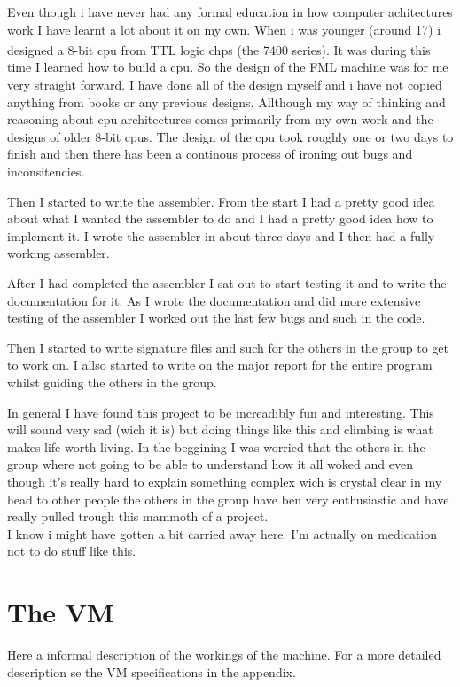 \documentclass{article}
\begin{document}
Even though i have never had any formal education in how computer achitectures
work I have learnt a lot about it on my own. When i was younger (around 17) i
designed a 8-bit cpu from TTL logic chps (the 7400
series\textsuperscript{\cite{7400}}). It was during this time I learned how to
build a cpu. So the design of the FML machine was for me very straight forward. 
I have done all of the design myself and i have not
copied anything from books or any previous designs. Allthough my way of thinking
and reasoning about cpu architectures comes primarily from my own work and the
designs of older 8-bit cpus. The design of the cpu took roughly one or two days
to finish and then there has been a continous process of ironing out bugs and
inconsitencies.

Then I started to write the assembler. From the start I had a pretty good idea
about what I wanted the assembler to do and I had a pretty good idea how to
implement it. I wrote the assembler in about three days and I then had a fully
working assembler.

After I had completed the assembler I sat out to start testing it and to write
the documentation for it. As I wrote the documentation and did more extensive
testing of the assembler I worked out the last few bugs and such in the code.

Then I started to write signature files and such for the others in the group to
get to work on. I allso started to write on the major report for the entire
program whilst guiding the others in the group.

In general I have found this project to be increadibly fun and interesting.
This will sound very sad (wich it is) but doing things like this and climbing
is what makes life worth living. In the beggining I was worried that the others
in the group where not going to be able to understand how it all woked and even 
though it's really hard to explain something complex wich is crystal clear in 
my head to other people the others in
the group have ben very enthusiastic and have really pulled trough this mammoth
of a project.
\\
I know i might have gotten a bit carried away here. I'm actually on medication
not to do stuff like this.


\section{The VM}
Here a informal description of the workings of the machine. For a more detailed
description se the VM specifications in the appendix.
\end{document}
